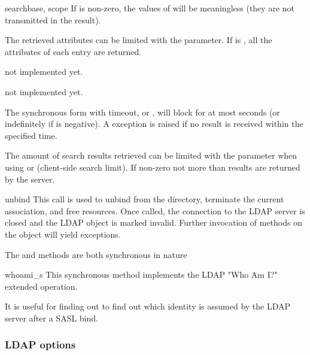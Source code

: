 \begin{methoddesc}[LDAPObject]{search}{base, scope }
If  is non-zero, the values of  will be meaningless
(they are not transmitted in the result).

The retrieved attributes can be limited with the  parameter.
If  is , all the attributes of each entry are returned.

 not implemented yet.

 not implemented yet.

The synchronous form with timeout,  or ,
will block for at most  seconds (or indefinitely if 
is negative). A  exception is raised if no result is received
within the specified time.

The amount of search results retrieved can be limited with the
 parameter when using 
or  (client-side search limit). If non-zero
not more than  results are returned by the server.

\end{methoddesc}


\begin{methoddesc}[LDAPObject]{unbind}{} %
This call is used to unbind from the directory, terminate the current
association, and free resources. Once called, the connection to the
LDAP server is closed and the LDAP object is marked invalid.
Further invocation of methods on the object will yield exceptions.

The  and  methods are both
synchronous in nature
\end{methoddesc}


\begin{methoddesc}[LDAPObject]{whoami_s}{} %
This synchronous method implements the LDAP "Who Am I?"
extended operation.

It is useful for finding out to find out which identity
is assumed by the LDAP server after a SASL bind.
\end{methoddesc}


\subsubsection{LDAP options}

